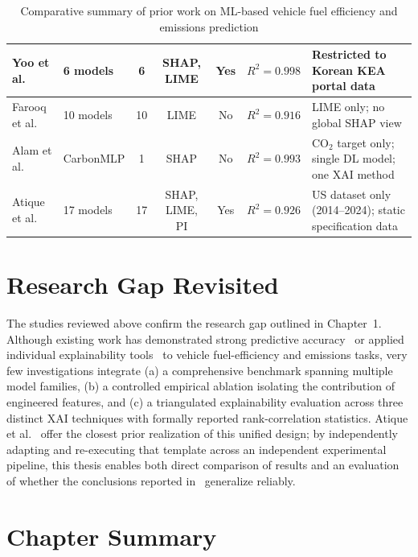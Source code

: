 \begin{table}[H]
{\begin{tabular}{|p{3cm}|p{2.8cm}|c|c|c|p{2.7cm}|p{4cm}|}
Yoo et al.~\cite{yoo2025machine}
& 6 models
& 6
& SHAP, LIME
& Yes
& $R^2 = 0.998$
& Restricted to Korean KEA portal data \\
\hline

Farooq et al.~\cite{farooq2025interpretable}
& 10 models
& 10
& LIME
& No
& $R^2 = 0.916$
& LIME only; no global SHAP view \\
\hline

Alam et al.~\cite{alam2025deep}
& CarbonMLP
& 1
& SHAP
& No
& $R^2 = 0.993$
& CO$_2$ target only; single DL model; one XAI method \\
\hline

Atique et al.~\cite{atique2026explainable}
& 17 models
& 17
& SHAP, LIME, PI
& Yes
& $R^2 = 0.926$
& US dataset only (2014--2024); static specification data \\
\hline

\end{tabular}
}
\caption{Comparative summary of prior work on ML-based vehicle fuel efficiency and emissions prediction}
\label{tab:related_work}
\end{table}

\section{Research Gap Revisited}

The studies reviewed above confirm the research gap outlined in Chapter~1. Although existing work has demonstrated strong predictive accuracy~\cite{alhakamy2023used}\cite{canal2024machine} or applied individual explainability tools~\cite{ghadi2025explainable,haque2025ensemblexai,alam2025deep} to vehicle fuel-efficiency and emissions tasks, very few investigations integrate (a) a comprehensive benchmark spanning multiple model families, (b) a controlled empirical ablation isolating the contribution of engineered features, and (c) a triangulated explainability evaluation across three distinct XAI techniques with formally reported rank-correlation statistics. Atique et al.~\cite{atique2026explainable} offer the closest prior realization of this unified design; by independently adapting and re-executing that template across an independent experimental pipeline, this thesis enables both direct comparison of results and an evaluation of whether the conclusions reported in~\cite{atique2026explainable} generalize reliably.

\section{Chapter Summary}


